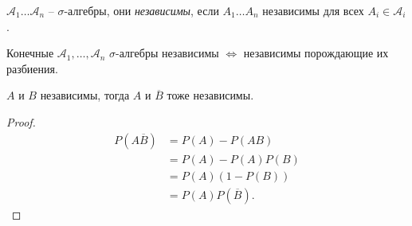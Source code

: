 \begin{definition}
  $\mathcal{A}_1 \ldots \mathcal{A}_n$ -- $\sigma$-алгебры, они \emph{независимы}, если $A_1 \ldots A_n$ независимы для всех $A_i \in \mathcal{A}_i$.
\end{definition}

\begin{theorem}
  Конечные $\mathcal{A}_1,\ldots,\mathcal{A}_n$ $\sigma$-алгебры независимы $\iff$ независимы порождающие их разбиения.
\end{theorem}

\begin{lemma}
  $A$ и $B$ независимы, тогда $A$ и $\overline{B}$ тоже независимы.
\end{lemma}

\begin{proof}
  \begin{align*}
    P(A\overline{B}) &= P(A) - P(AB) \\
    &= P(A)-P(A)P(B) \\
    &= P(A)\left(1-P(B)\right) \\
    &= P(A)P(\overline{B}).
  \end{align*}
\end{proof}

